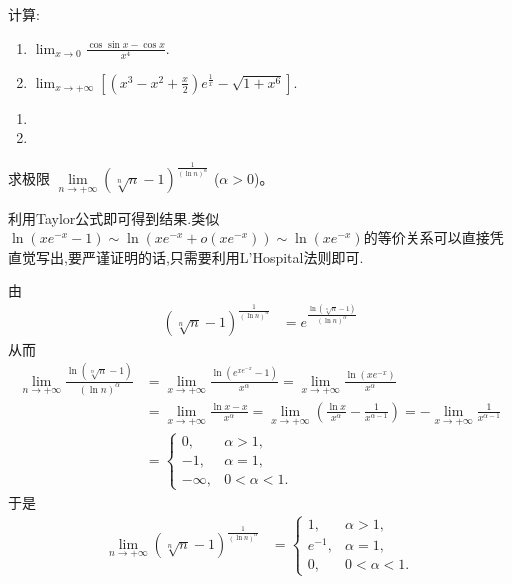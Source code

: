 \documentclass[../../main.tex]{subfiles}%
\begin{document}
\begin{example}
计算:
\begin{enumerate}
\item \(
\lim_{x \to 0} \frac{\cos \sin x - \cos x}{x^4}.
\)

\item \(
\lim_{x \to +\infty} \left[\left(x^3 - x^2 + \frac{x}{2}\right) e^{\frac{1}{x}} - \sqrt{1 + x^6}\right].
\)
\end{enumerate}
\end{example}
\begin{solution}
\begin{enumerate}
\item 

\item 
\end{enumerate}

\end{solution}

\begin{example}
求极限 $\lim\limits_{n \to +\infty} (\sqrt[n]{n} - 1)^{\frac{1}{(\ln n)^{\alpha}}}$ ($\alpha > 0$)。
\end{example}
\begin{note}
利用Taylor公式即可得到结果.类似$\ln \left( xe^{-x}-1 \right) \sim \ln \left( xe^{-x}+o\left( xe^{-x} \right) \right) \sim \ln \left( xe^{-x} \right)$的等价关系可以直接凭直觉写出,要严谨证明的话,只需要利用L'Hospital法则即可.
\end{note}
\begin{solution}
由
\begin{align*}
(\sqrt[n]{n} - 1)^{\frac{1}{(\ln n)^{\alpha}}} &= e^{\frac{\ln(\sqrt[n]{n} - 1)}{(\ln n)^{\alpha}}}
\end{align*}
从而
\begin{align*}
\lim_{n \to +\infty} \frac{\ln(\sqrt[n]{n} - 1)}{(\ln n)^{\alpha}} &= \lim_{x \to +\infty} \frac{\ln(e^{x e^{-x}} - 1)}{x^{\alpha}} = \lim_{x \to +\infty} \frac{\ln(x e^{-x})}{x^{\alpha}} \\
&= \lim_{x \to +\infty} \frac{\ln x - x}{x^{\alpha}} = \lim_{x \to +\infty} \left(\frac{\ln x}{x^{\alpha}} - \frac{1}{x^{\alpha - 1}}\right) = - \lim_{x \to +\infty} \frac{1}{x^{\alpha - 1}} \\
&= \begin{cases}
0, & \alpha > 1, \\
-1, & \alpha = 1, \\
-\infty, & 0 < \alpha < 1.
\end{cases}
\end{align*}
于是
\begin{align*}
\lim_{n \to +\infty} (\sqrt[n]{n} - 1)^{\frac{1}{(\ln n)^{\alpha}}} &= \begin{cases}
1, & \alpha > 1, \\
e^{-1}, & \alpha = 1, \\
0, & 0 < \alpha < 1.
\end{cases}
\end{align*} 

\end{solution}
\end{document}
